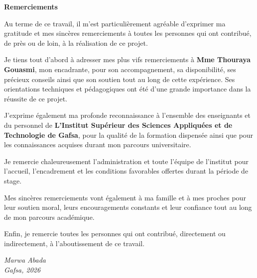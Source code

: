 \vfill\null
\newpage

\thispagestyle{empty}
\begin{center}
  {\Large\bfseries Remerciements}\\[0.6cm]
\end{center}
\vspace{0.8cm}

Au terme de ce travail, il m'est particulièrement agréable d'exprimer ma
gratitude et mes sincères remerciements à toutes les personnes qui ont
contribué, de près ou de loin, à la réalisation de ce projet.

Je tiens tout d'abord à adresser mes plus vifs remerciements à
\textbf{Mme Thouraya Gouasmi}, mon encadrante, pour son accompagnement,
sa disponibilité, ses précieux conseils ainsi que son soutien tout au long
de cette expérience. Ses orientations techniques et pédagogiques ont été
d'une grande importance dans la réussite de ce projet.

J'exprime également ma profonde reconnaissance à l'ensemble des enseignants
et du personnel de \textbf{L'Institut Supérieur des Sciences Appliquées et de Technologie de Gafsa},
pour la qualité de la formation dispensée ainsi que pour les connaissances
acquises durant mon parcours universitaire.

Je remercie chaleureusement l'administration et toute l'équipe de
l'institut pour l'accueil, l'encadrement et les conditions favorables
offertes durant la période de stage.

Mes sincères remerciements vont également à ma famille et à mes proches
pour leur soutien moral, leurs encouragements constants et leur confiance
tout au long de mon parcours académique.

Enfin, je remercie toutes les personnes qui ont contribué, directement ou
indirectement, à l'aboutissement de ce travail.

\vspace{1cm}
\begin{flushright}
\itshape Marwa Abada\\
Gafsa, 2026
\end{flushright}

\newpage

